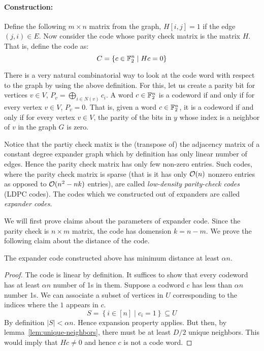 \paragraph{Construction:} Define the following $m \times n$ matrix from the graph, $H[i,j] = 1$ if the edge $(j,i) \in E$. Now consider the code whose parity check matrix is the matrix $H$. That is, define the code as:
$$ C = \{ c \in {\mathbb{F}}_2^n \mid Hc = 0 \}$$

There is a very natural combinatorial way to look at the code word with respect to the graph by using the above definition. For this, let us create a parity bit for vertices $v \in V$, $P_v = \bigoplus_{i \in N(v)} c_i$. A word $c \in {\mathbb{F}}_2^n$ is a codeword if and only if for every vertex $v \in V$, $P_v = 0$. That is, given a word $c \in {\mathbb{F}}_2^n$, it is a codeword if and only if for every vertex $v \in V$, the parity of the bits in $y$ whose index is a neighbor of $v$ in the graph $G$ is zero.

Notice that the partiy check matix is the (transpose of) the adjacency matrix of a constant degree expander graph which by definition has only linear number of edges. Hence the parity check matrix has only few non-zero entries. Such codes, where the parity check matrix is sparse (that is it has only ${\cal O}(n)$ nonzero entries as opposed to ${\cal O}(n^2-nk)$ entries), are called \textit{low-density parity-check codes} (LDPC codes). The codes which we constructed out of expanders are called \textit{expander codes}.

We will first prove claims about the parameters of expander code. Since the parity check is $n \times m$ matrix, the code has domension $k = n-m$. We prove the following claim about the distance of the code.

\begin{lemma}
The expander code constructed above has minimum distance at least $\alpha n$.
\end{lemma}
\begin{proof}
The code is linear by definition. It suffices to show that every codeword has at least $\alpha n$ number of 1s in them. Suppose a codword $c$ has less than $\alpha n$ number 1s. We can associate a subset of vertices in $U$ corresponding to the indices where the $1$ appears in $c$.
$$S = \left\{ i \in [n] \mid c_i = 1 \right\} \subseteq U$$
By definition $|S| < \alpha n$. Hence expansion property applies. But then, by lemma~\ref{lem:unique-neighbors}, there must be at least $D/2$ unique neighbors. This would imply that $Hc \ne 0$ and hence $c$ is not a code word.
\end{proof}

